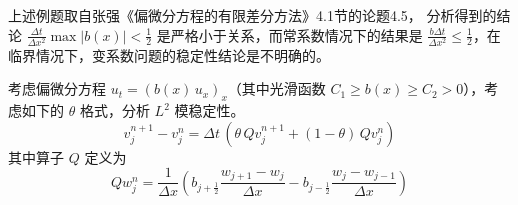 \begin{remark}
    上述例题取自张强《偏微分方程的有限差分方法》4.1节的论题4.5，
    分析得到的结论 $\frac{\Delta t}{\Delta x^2} \max | b(x)| < \frac12$ 是严格小于关系，而常系数情况下的结果是 $\frac{b \Delta t}{\Delta x^2} \le \frac12$，在临界情况下，变系数问题的稳定性结论是不明确的。
\end{remark}


\begin{example}
    考虑偏微分方程 $u_t=(b(x)\, u_x)_x$（其中光滑函数 $C_1 \ge b(x) \ge C_2 > 0$），考虑如下的 $\theta$ 格式，分析 $L^2$ 模稳定性。
    \[
        v^{n+1}_j - v^n_j = \Delta t\,(\theta\,Q v^{n+1}_j+(1-\theta)\, Q v^n_j)
    \]
    其中算子 $Q$ 定义为
    \[
        Q w^n_j=\frac{1}{\Delta x}\left(b_{j+\frac12} \frac{w_{j+1}-w_{j}}{\Delta x} - b_{j-\frac12}\frac{w_j-w_{j-1}}{\Delta x}\right)
    \]
\end{example}

